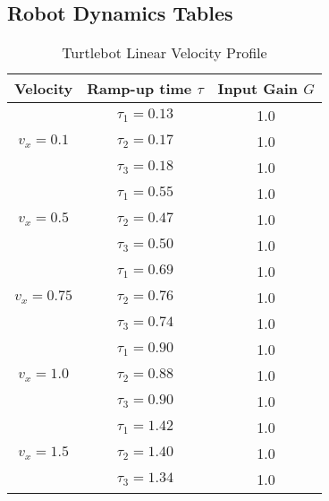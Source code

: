 \documentclass[14pt,letterpaper]{article}
\begin{document}
\subsection{Robot Dynamics Tables}

\begin{table}[H]
\centering
\caption{Turtlebot Linear Velocity Profile}
\begin{tabular}{ccc}
\toprule
\textbf{Velocity} & \textbf{Ramp-up time $\tau$} & \textbf{Input Gain $G$} \\
\midrule
\multirow{3}{*}{$v_x = 0.1$} & $\tau_1= 0.13$ & 1.0 \\
                             & $\tau_2= 0.17$ & 1.0 \\
                             & $\tau_3= 0.18$ & 1.0 \\
\midrule
\multirow{3}{*}{$v_x = 0.5$} & $\tau_1= 0.55$ & 1.0 \\
                             & $\tau_2= 0.47$ & 1.0 \\
                             & $\tau_3= 0.50$ & 1.0 \\
\midrule
\multirow{3}{*}{$v_x = 0.75$} & $\tau_1= 0.69$ & 1.0 \\
                             & $\tau_2= 0.76$ & 1.0 \\
                             & $\tau_3= 0.74$ & 1.0 \\
\midrule
\multirow{3}{*}{$v_x = 1.0$} & $\tau_1= 0.90$ & 1.0 \\
                             & $\tau_2= 0.88$ & 1.0 \\
                             & $\tau_3= 0.90$ & 1.0 \\
\midrule
\multirow{3}{*}{$v_x = 1.5$} & $\tau_1= 1.42$ & 1.0 \\
                             & $\tau_2= 1.40$ & 1.0 \\
                             & $\tau_3= 1.34$ & 1.0 \\

\bottomrule
\end{tabular}
\end{table}
\end{document}
